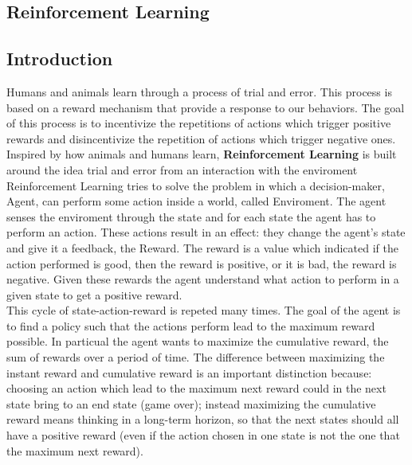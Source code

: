 \documentclass[14pt]{extarticle}
\def\sp{\vspace{5pt}}
\def\pp{\vspace{10pt}\newline}
\begin{document}
\newpage
\begin{center}
	\section{Reinforcement Learning}
\end{center}

\subsection{Introduction}
\sp
\begin{flushleft}
Humans and animals learn through a process of trial and error. This process is based on a reward mechanism that provide a response to our behaviors. The goal of this process is to incentivize the repetitions of actions which trigger positive rewards and disincentivize the repetition of actions which trigger negative ones.
\\
Inspired by how animals and humans learn, \textbf{Reinforcement Learning} is built around the idea trial and error from an interaction with the enviroment 
\pp
Reinforcement Learning tries to solve the problem in which a decision-maker, Agent, can perform some action inside a world, called Enviroment. The agent senses the enviroment through the state and for each state the agent has to perform an action. These actions result in an effect: they change the agent's state and give it a feedback, the Reward. The reward is a value which indicated if the action performed is good, then the reward is positive, or it is bad, the reward is negative. Given these rewards the agent understand what action to perform in a given state to get a positive reward. 
\\
This cycle of state-action-reward is repeted many times. The goal of the agent is to find a policy such that the actions perform lead to the maximum reward possible. In particual the agent wants to maximize the cumulative reward, the sum of rewards over a period of time. The difference between maximizing the instant reward and cumulative reward is an important distinction because: choosing an action which lead to the maximum next reward could in the next state bring to an end state (game over); instead maximizing the cumulative reward means thinking in a long-term horizon, so that the next states should all have a positive reward (even if the action chosen in one state is not the one that the
maximum next reward).


\end{flushleft}
\end{document}
